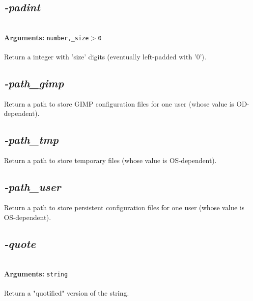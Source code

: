 \documentclass[a4paper,11pt,twoside]{book}
\begin{document}
\subsection{\emph{-padint} }\vspace*{-0.5em}
~\\\textbf{Arguments: } 
{\small \texttt{number,\_size$>$0}}\\~\\
Return a integer with 'size' digits (eventually left-padded with '0').


\subsection{\emph{-path\_gimp} }\vspace*{-0.5em}
Return a path to store GIMP configuration files for one user (whose value is OD-dependent).


\subsection{\emph{-path\_tmp} }\vspace*{-0.5em}
Return a path to store temporary files (whose value is OS-dependent).


\subsection{\emph{-path\_user} }\vspace*{-0.5em}
Return a path to store persistent configuration files for one user (whose value is OS-dependent).


\subsection{\emph{-quote} }\vspace*{-0.5em}
~\\\textbf{Arguments: } 
{\small \texttt{string}}\\~\\
Return a "quotified" version of the string.
\end{document}
